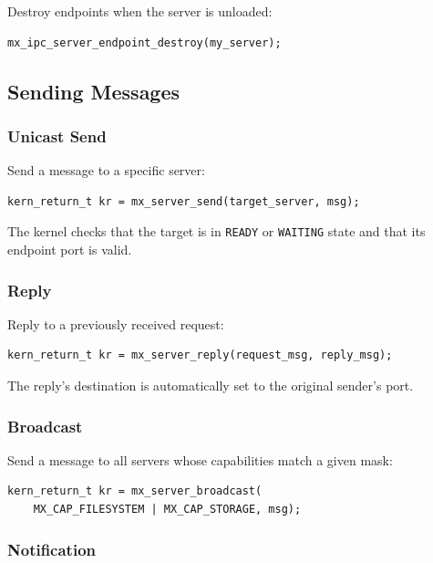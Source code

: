 \documentclass[a4paper,11pt]{article}
\begin{document}
Destroy endpoints when the server is unloaded:

\begin{lstlisting}
mx_ipc_server_endpoint_destroy(my_server);
\end{lstlisting}

\subsection{Sending Messages}

\subsubsection{Unicast Send}

Send a message to a specific server:

\begin{lstlisting}
kern_return_t kr = mx_server_send(target_server, msg);
\end{lstlisting}

The kernel checks that the target is in \texttt{READY} or
\texttt{WAITING} state and that its endpoint port is valid.

\subsubsection{Reply}

Reply to a previously received request:

\begin{lstlisting}
kern_return_t kr = mx_server_reply(request_msg, reply_msg);
\end{lstlisting}

The reply's destination is automatically set to the original
sender's port.

\subsubsection{Broadcast}

Send a message to all servers whose capabilities match a given mask:

\begin{lstlisting}
kern_return_t kr = mx_server_broadcast(
    MX_CAP_FILESYSTEM | MX_CAP_STORAGE, msg);
\end{lstlisting}

\subsubsection{Notification}
\end{document}
